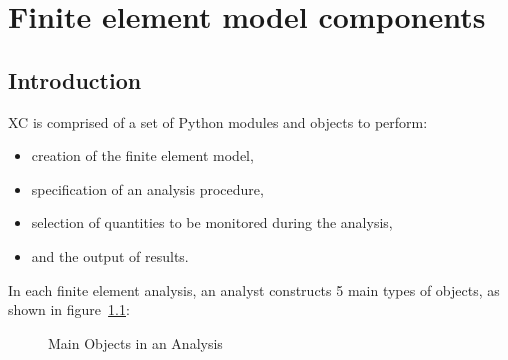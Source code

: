 \chapter{Finite element model components}

\section{Introduction}
XC is comprised of a set of Python modules and objects to perform:

\begin{itemize}
\item creation of the finite element model,
\item specification of an analysis procedure,
\item selection of quantities to be monitored during the analysis,
\item and the output of results.
\end{itemize}

In each finite element analysis, an analyst constructs 5 main types of objects, as shown in figure~\ref{main}:

\begin{figure}[htpb]
\caption{Main Objects in an Analysis}
\label{main}
\end{figure}

